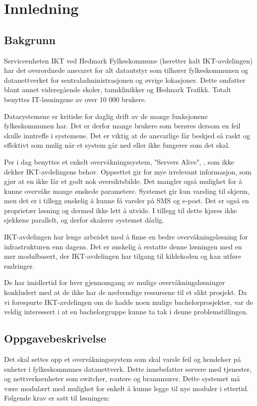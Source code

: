 \chapter{Innledning}
\section{Bakgrunn}
Serviceenheten IKT ved Hedmark Fylkeskommune (heretter kalt IKT-avdelingen) har det overordnede ansvaret for alt datautstyr som tilhører fylkeskommunen og datanettverket for sentraladministrasjonen og øvrige lokasjoner. Dette omfatter blant annet videregående skoler, tannklinikker og Hedmark Trafikk. Totalt benyttes IT-løsningene av over 10 000 brukere.

Datasystemene er kritiske for daglig drift av de mange funksjonene fylkeskommunen har. Det er derfor mange brukere som berøres dersom en feil skulle inntreffe i systemene. Det er viktig at de ansvarlige får beskjed så raskt og effektivt som mulig når et system går ned eller ikke fungerer som det skal.

Per i dag benyttes et enkelt overvåkningssystem, "Servers Alive", \cite{servers}, som ikke dekker IKT-avdelingens behov. Oppsettet gir for mye irrelevant informasjon, som gjør at en ikke får et godt nok oversiktsbilde. Det mangler også mulighet for å kunne overvåke mange ønskede parametere. Systemet gir kun varsling til skjerm, men det er i tillegg ønskelig å kunne få varsler på SMS og e-post. Det er også en proprietær løsning og dermed ikke lett å utvide. I tillegg til dette kjøres ikke sjekkene parallelt, og derfor skalerer systemet dårlig.

IKT-avdelingen har lenge arbeidet med å finne en bedre overvåkningsløsning for infrastrukturen enn dagens. Det er ønskelig å erstatte denne løsningen med en mer modulbasert, der IKT-avdelingen har tilgang til kildekoden og kan utføre endringer.

De har imidlertid for hver gjennomgang av mulige overvåkningsløsninger konkludert med at de ikke har de nødvendige ressursene til et slikt prosjekt. Da vi forespurte IKT-avdelingen om de hadde noen mulige bachelorprosjekter, var de veldig interessert i at en bachelorgruppe kunne ta tak i denne problemstillingen.

\section*{Oppgavebeskrivelse}
Det skal settes opp et overvåkningssystem som skal varsle feil og hendelser på enheter i fylkeskommunes datanettverk. Dette innebefatter servere med tjenester, og nettverksenheter som switcher, routere og brannmurer. Dette systemet må være modulært med mulighet for enkelt å kunne legge til nye moduler i ettertid. Følgende krav er satt til løsningen:

